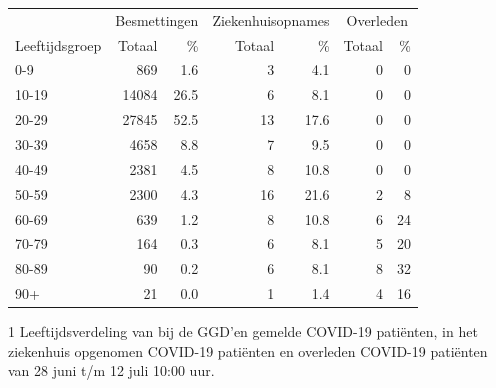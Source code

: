 \documentclass[
  english,
  man,floatsintext]{apa6}
\begin{document}
\begin{table}
\centering\begingroup\fontsize{11}{13}\selectfont

\begin{threeparttable}
\begin{tabular}{lrrrrrr}
\toprule
\multicolumn{1}{c}{ } & \multicolumn{2}{c}{Besmettingen} & \multicolumn{2}{c}{Ziekenhuisopnames} & \multicolumn{2}{c}{Overleden} \\
\cmidrule(l{3pt}r{3pt}){2-3} \cmidrule(l{3pt}r{3pt}){4-5} \cmidrule(l{3pt}r{3pt}){6-7}
Leeftijdsgroep & Totaal & \% & Totaal & \% & Totaal & \%\\
\midrule
0-9 & 869 & 1.6 & 3 & 4.1 & 0 & 0\\
10-19 & 14084 & 26.5 & 6 & 8.1 & 0 & 0\\
20-29 & 27845 & 52.5 & 13 & 17.6 & 0 & 0\\
30-39 & 4658 & 8.8 & 7 & 9.5 & 0 & 0\\
40-49 & 2381 & 4.5 & 8 & 10.8 & 0 & 0\\
50-59 & 2300 & 4.3 & 16 & 21.6 & 2 & 8\\
60-69 & 639 & 1.2 & 8 & 10.8 & 6 & 24\\
70-79 & 164 & 0.3 & 6 & 8.1 & 5 & 20\\
80-89 & 90 & 0.2 & 6 & 8.1 & 8 & 32\\
90+ & 21 & 0.0 & 1 & 1.4 & 4 & 16\\
\bottomrule
\end{tabular}
\begin{tablenotes}
\item[1] Leeftijdsverdeling van bij de GGD’en gemelde COVID-19 patiënten, in het ziekenhuis opgenomen COVID-19 patiënten en overleden COVID-19 patiënten van 28 juni t/m 12 juli 10:00 uur.
\end{tablenotes}
\end{threeparttable}
\endgroup{}
\end{table}

\newpage
\end{document}
